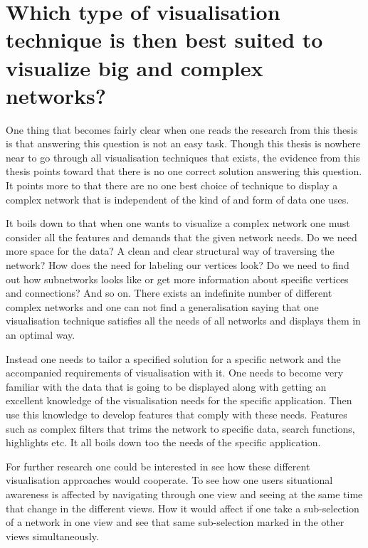 \documentclass[a4paper,11pt]{kth-mag}
\begin{document}
\section{Which type of visualisation technique is then best suited to visualize big and complex networks?}
\label{sec:conclution}
One thing that becomes fairly clear when one reads the research from this thesis is that answering this question
is not an easy task. Though this thesis is nowhere near to go through all visualisation techniques
that exists, the evidence from this thesis points toward that there is no one correct solution answering this
question. It points more to that there are no one best choice of technique to display a complex network that is
independent of the kind of and form of data one uses.

It boils down to that when one wants to visualize a complex network one must consider all the features and demands
that the given network needs. Do we need more space for the data? A clean and clear structural way of traversing the network?
How does the need for labeling our vertices look? Do we need to find out how subnetworks looks like or get more information 
about specific vertices and connections? And so on. There exists an indefinite number of different complex networks
and one can not find a generalisation saying that one visualisation technique satisfies all the needs of all networks and 
displays them in an optimal way.

Instead one needs to tailor a specified solution for a specific network and the accompanied requirements of visualisation with it. One needs to 
become very familiar with the data that is going to be displayed along with getting an excellent knowledge of the visualisation needs for the specific
 application. Then use this knowledge to develop features that comply with these needs. Features such as complex filters that
 trims the network to specific data, search functions, highlights etc. It all boils down too the needs of the 
 specific application.
 
 For further research one could be interested in see how these different visualisation approaches would 
 cooperate. To see how one users situational awareness is affected by navigating through one view and seeing
 at the same time that change in the different views. How it would affect if one take a sub-selection of 
 a network in one view and see that same sub-selection marked in the other views simultaneously.
\end{document}
